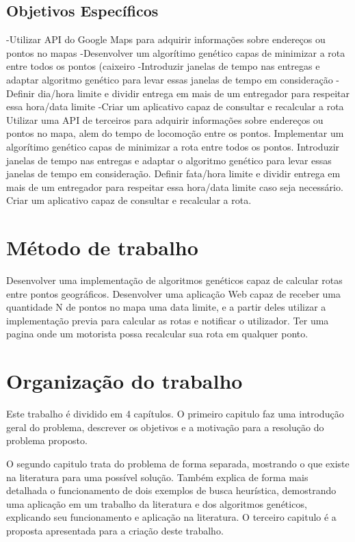 \subsection{Objetivos Específicos}

-Utilizar API do Google Maps para adquirir informações sobre endereços ou pontos no mapas
-Desenvolver um algorítimo genético capas de minimizar a rota entre todos os pontos (caixeiro
-Introduzir janelas de tempo nas entregas e adaptar algoritmo genético para levar essas janelas de tempo em consideração
-Definir dia/hora limite e dividir entrega em mais de um entregador para respeitar essa hora/data limite
-Criar um aplicativo capaz de consultar e recalcular a rota
Utilizar uma API de terceiros para adquirir informações sobre endereços ou pontos no mapa, alem do tempo de locomoção entre os pontos.
Implementar um algorítimo genético capas de minimizar a rota entre todos os pontos.
Introduzir janelas de tempo nas entregas e adaptar o algoritmo genético para levar essas janelas de tempo em consideração.
Definir fata/hora limite e dividir entrega em mais de um entregador para respeitar essa hora/data limite caso seja necessário.
Criar um aplicativo capaz de consultar e recalcular a rota.

\section{Método de trabalho}

Desenvolver uma implementação de algoritmos genéticos capaz de calcular rotas entre pontos geográficos.
Desenvolver uma aplicação Web capaz de receber uma quantidade N de pontos no mapa uma data limite, e a partir deles utilizar a implementação previa para calcular as rotas e 
notificar o utilizador.
Ter uma pagina onde um motorista possa recalcular sua rota em qualquer ponto.

\section{Organização do trabalho}
Este trabalho é dividido em 4 capítulos. O primeiro capitulo faz uma introdução geral do problema, descrever os objetivos e a motivação para a resolução do problema proposto.

O segundo capitulo trata do problema de forma separada, mostrando o que existe na literatura para uma possível solução. Também explica de forma mais detalhada o funcionamento de dois exemplos de busca heurística, demostrando uma aplicação em um trabalho da literatura e dos algoritmos genéticos, explicando seu funcionamento e aplicação na literatura.
O terceiro capitulo é a proposta apresentada para a criação deste trabalho.

